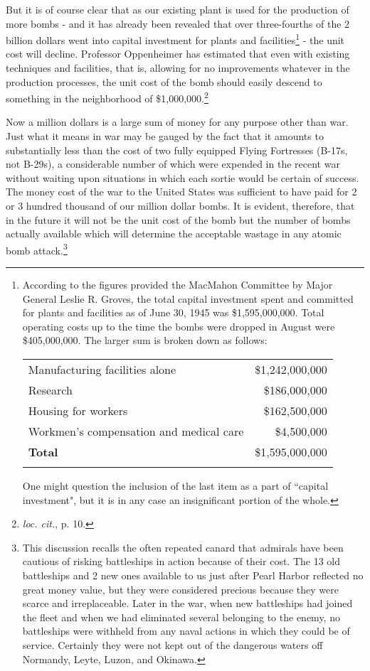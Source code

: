 But it is of course clear that as our existing plant is used for the production of more bombs - and it has already been revealed that over three-fourths of the 2 billion dollars went into capital investment for plants and facilities\footnote{According to the figures provided the MacMahon Committee by Major General Leslie R. Groves, the total capital investment spent and committed for plants and facilities as of June 30, 1945 was \$1,595,000,000. Total operating costs up to the time the bombs were dropped in August were \$405,000,000. The larger sum is broken down as follows:

\vspace{10pt}

\begin{tabular}{@{}lr@{}}
\toprule
Manufacturing facilities alone				&	\$1,242,000,000\\
Research								&	\$186,000,000\\
Housing for workers						&	\$162,500,000\\
Workmen's compensation and medical care	&	\$4,500,000\\
\midrule
\textbf{Total}							&	\$1,595,000,000\\
\botrule
\end{tabular}

\vspace{10pt}

One might question the inclusion of the last item as a part of ``capital investment", but it is in any case an insignificant portion of the whole.} - the unit cost will decline. Professor Oppenheimer has estimated that even with existing techniques and facilities, that is, allowing for no improvements whatever in the production processes, the unit cost of the bomb should easily descend to something in the neighborhood of \$1,000,000.\footnote{\textit{loc. cit.}, p. 10.}

Now a million dollars is a large sum of money for any purpose other than war. Just what it means in war may be gauged by the fact that it amounts to substantially less than the cost of two fully equipped Flying Fortresses (B-17s, not B-29s), a considerable number of which were expended in the recent war without waiting upon situations in which each sortie would be certain of success. The money cost of the war to the United States was sufficient to have paid for 2 or 3 hundred thousand of our million dollar bombs. It is evident, therefore, that in the future it will not be the unit cost of the bomb but the number of bombs actually available which will determine the acceptable wastage in any atomic bomb attack.\footnote{This discussion recalls the often repeated canard that admirals have been cautious of risking battleships in action because of their cost. The 13 old battleships and 2 new ones available to us just after Pearl Harbor reflected no great money value, but they were considered precious because they were scarce and irreplaceable. Later in the war, when new battleships had joined the fleet and when we had eliminated several belonging to the enemy, no battleships were withheld from any naval actions in which they could be of service. Certainly they were not kept out of the dangerous waters off Normandy, Leyte, Luzon, and Okinawa.}

